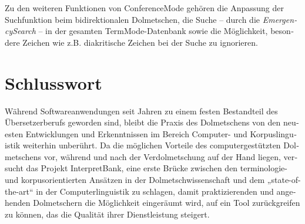 \documentclass[output=paper]{LSP/langsci}
\begin{document}
\begin{otherlanguage}{ngerman}
Zu den weiteren Funktionen von ConferenceMode gehören die Anpassung der Suchfunktion beim bidirektionalen Dolmetschen, die Suche -- durch die \textit{EmergencySearch} -- in der gesamten TermMode-Datenbank sowie die Möglichkeit, besondere Zeichen wie z.B. diakritische Zeichen bei der Suche zu ignorieren.

\section{Schlusswort}\label{sec:fantinuoli:7}

Während Softwareanwendungen seit Jahren zu einem festen Bestandteil des Übersetzerberufs geworden sind, bleibt die Praxis des Dolmetschens von den neuesten Entwicklungen und Erkenntnissen im Bereich Computer- und Korpuslinguistik weiterhin unberührt. Da die möglichen Vorteile des computergestützten Dolmetschens vor, während und nach der Verdolmetschung auf der Hand liegen, versucht das Projekt InterpretBank, eine erste Brücke zwischen den terminologie- und korpusorientierten Ansätzen in der Dolmetschwissenschaft und dem „state-of-the-art“ in der Computerlinguistik zu schlagen, damit praktizierenden und angehenden Dolmetschern die Möglichkeit eingeräumt wird, auf ein Tool zurückgreifen zu können, das die Qualität ihrer Dienstleistung steigert. 

\end{otherlanguage}
{\sloppy 
\printbibliography[heading=subbibliography,notkeyword=this]
}
\end{document}
